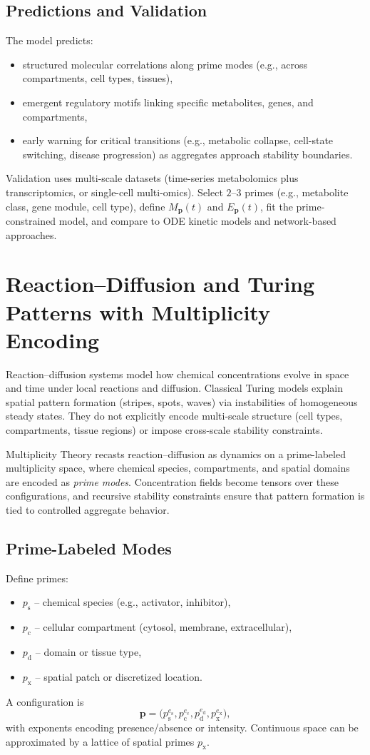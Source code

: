 \documentclass[11pt]{article}
\begin{document}
\subsection{Predictions and Validation}
The model predicts:
\begin{itemize}
    \item structured molecular correlations along prime modes (e.g., across compartments, cell types, tissues),
    \item emergent regulatory motifs linking specific metabolites, genes, and compartments,
    \item early warning for critical transitions (e.g., metabolic collapse, cell-state switching, disease progression) as aggregates approach stability boundaries.
\end{itemize}
Validation uses multi-scale datasets (time-series metabolomics plus transcriptomics, or single-cell multi-omics). Select $2$--$3$ primes (e.g., metabolite class, gene module, cell type), define $M_{\mathbf{p}}(t)$ and $E_{\mathbf{p}}(t)$, fit the prime-constrained model, and compare to ODE kinetic models and network-based approaches.

\section{Reaction--Diffusion and Turing Patterns with Multiplicity Encoding}
Reaction--diffusion systems model how chemical concentrations evolve in space and time under local reactions and diffusion. Classical Turing models explain spatial pattern formation (stripes, spots, waves) via instabilities of homogeneous steady states. They do not explicitly encode multi-scale structure (cell types, compartments, tissue regions) or impose cross-scale stability constraints.

Multiplicity Theory recasts reaction--diffusion as dynamics on a prime-labeled multiplicity space, where chemical species, compartments, and spatial domains are encoded as \emph{prime modes}. Concentration fields become tensors over these configurations, and recursive stability constraints ensure that pattern formation is tied to controlled aggregate behavior.

\subsection{Prime-Labeled Modes}
Define primes:
\begin{itemize}
    \item $p_{\text{s}}$ -- chemical species (e.g., activator, inhibitor),
    \item $p_{\text{c}}$ -- cellular compartment (cytosol, membrane, extracellular),
    \item $p_{\text{d}}$ -- domain or tissue type,
    \item $p_{\text{x}}$ -- spatial patch or discretized location.
\end{itemize}
A configuration is
\[
\mathbf{p}
=
\big(
p_{\text{s}}^{e_{\text{s}}},
p_{\text{c}}^{e_{\text{c}}},
p_{\text{d}}^{e_{\text{d}}},
p_{\text{x}}^{e_{\text{x}}}
\big),
\]
with exponents encoding presence/absence or intensity. Continuous space can be approximated by a lattice of spatial primes $p_{\text{x}}$.
\end{document}
